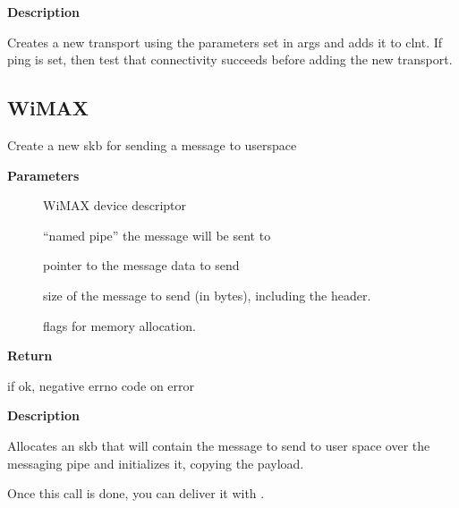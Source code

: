 \documentclass[a4paper,8pt,english]{sphinxmanual}
\begin{document}
\textbf{Description}

Creates a new transport using the parameters set in args and
adds it to clnt.
If ping is set, then test that connectivity succeeds before
adding the new transport.


\subsection{WiMAX}
\label{networking/kapi:wimax}

\begin{fulllineitems}
\label{networking/kapi:c.wimax_msg_alloc}
Create a new skb for sending a message to userspace

\end{fulllineitems}


\textbf{Parameters}
\begin{description}
\item[{}] \leavevmode
WiMAX device descriptor

\item[{}] \leavevmode
``named pipe'' the message will be sent to

\item[{}] \leavevmode
pointer to the message data to send

\item[{}] \leavevmode
size of the message to send (in bytes), including the header.

\item[{}] \leavevmode
flags for memory allocation.

\end{description}

\textbf{Return}

 if ok, negative errno code on error

\textbf{Description}

Allocates an skb that will contain the message to send to user
space over the messaging pipe and initializes it, copying the
payload.

Once this call is done, you can deliver it with
{\hyperref[networking/kapi:c.wimax_msg_send]{\emph{}}}.
\end{document}
